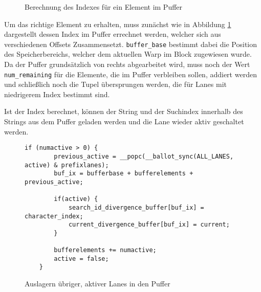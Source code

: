 \begin{figure}[ht]
	\caption{Berechnung des Indexes für ein Element im Puffer}
	\label{fig:buffer_index}
\end{figure}

Um das richtige Element zu erhalten, muss zunächst wie in Abbildung \ref{fig:buffer_index} dargestellt dessen Index im Puffer errechnet werden, welcher sich aus verschiedenen Offsets Zusammensetzt.
\texttt{buffer\_base} bestimmt dabei die Position des Speicherbereichs, welcher dem aktuellen Warp im Block zugewiesen wurde.
Da der Puffer grundsätzlich von rechts abgearbeitet wird, muss noch der Wert \texttt{num\_remaining} für die Elemente, die im Puffer verbleiben sollen, addiert werden und schließlich noch die Tupel übersprungen werden, die für Lanes mit niedrigerem Index bestimmt sind.

Ist der Index berechnet, können der String und der Suchindex innerhalb des Strings aus dem Puffer geladen werden und die Lane wieder aktiv geschaltet werden.

\begin{figure}[ht]
	\begin{lstlisting}[language=MyC++]
	if (numactive > 0) {
		previous_active = __popc(__ballot_sync(ALL_LANES, active) & prefixlanes);
		buf_ix = bufferbase + bufferelements + previous_active;
		
		if(active) {
			search_id_divergence_buffer[buf_ix] = character_index;
			current_divergence_buffer[buf_ix] = current;
		}
		
		bufferelements += numactive;
		active = false;
	}
	\end{lstlisting}
	\caption{Auslagern übriger, aktiver Lanes in den Puffer}
	\label{flush_code}
\end{figure}

